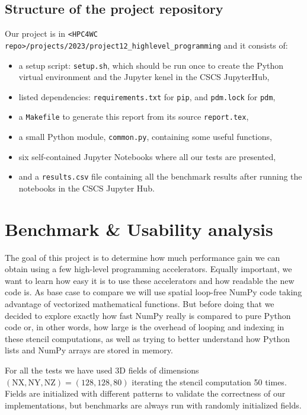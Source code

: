 \documentclass[12pt]{article}
\begin{document}
\subsection{Structure of the project repository}

Our project is in \texttt{<HPC4WC repo>/projects/2023/project12\_highlevel\_programming} and it consists of:
\begin{itemize}
    \item a setup script: \texttt{setup.sh}, which should be run once to create the Python virtual environment and the Jupyter kenel in the CSCS JupyterHub,
    \item listed dependencies: \texttt{requirements.txt} for \texttt{pip}, and \texttt{pdm.lock} for \texttt{pdm},
    \item a \texttt{Makefile} to generate this report from its source \texttt{report.tex},
    \item a small Python module, \texttt{common.py}, containing some useful functions,
    \item six self-contained Jupyter Notebooks where all our tests are presented,
    \item and a \texttt{results.csv} file containing all the benchmark results after running the notebooks in the CSCS Jupyter Hub.
\end{itemize}

\section{Benchmark \& Usability analysis}

The goal of this project is to determine how much performance gain we can obtain using a few high-level programming accelerators. Equally important, we want to learn how easy it is to use these accelerators and how readable the new code is. As base case to compare we will use spatial loop-free NumPy code taking advantage of vectorized mathematical functions. But before doing that we decided to explore exactly how fast NumPy really is compared to pure Python code or, in other words, how large is the overhead of looping and indexing in these stencil computations, as well as trying to better understand how Python lists and NumPy arrays are stored in memory.

For all the tests we have used 3D fields of dimensions $(\text{NX}, \text{NY}, \text{NZ}) = (128,128,80)$ iterating the stencil computation 50 times. Fields are initialized with different patterns to validate the correctness of our implementations, but benchmarks are always run with randomly initialized fields.
\end{document}
